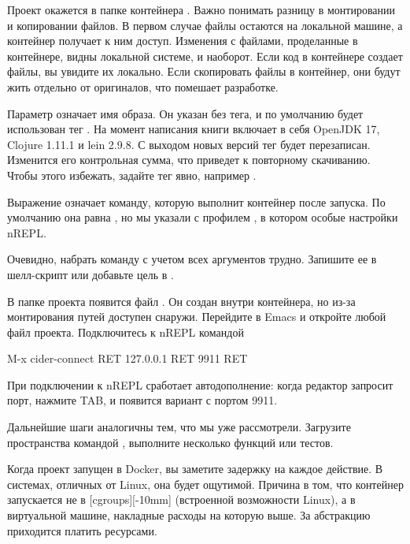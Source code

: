 Проект окажется в папке контейнера . Важно понимать разницу в монтировании и копировании файлов. В первом случае файлы остаются на локальной машине, а контейнер получает к ним доступ. Изменения с файлами, проделанные в контейнере, видны локальной системе, и наоборот. Если код в контейнере создает файлы, вы увидите их локально. Если скопировать файлы в контейнер, они будут жить отдельно от оригиналов, что помешает разработке.

Параметр   означает имя образа. Он указан без тега, и по умолчанию будет использован тег . На момент написания книги  включает в себя OpenJDK 17, Clojure 1.11.1 и lein 2.9.8. С выходом новых версий тег  будет перезаписан. Изменится его контрольная сумма, что приведет к повторному скачиванию. Чтобы этого избежать, задайте тег явно, например .

Выражение   означает команду, которую выполнит контейнер после запуска. По умолчанию она равна , но мы указали  с профилем , в котором особые настройки nREPL.

Очевидно, набрать команду  с учетом всех аргументов трудно. Запишите ее в шелл-скрипт или добавьте цель в .

В папке проекта появится файл . Он создан внутри контейнера, но из-за монтирования путей доступен снаружи. Перейдите в Emacs и откройте любой файл проекта. Подключитесь к nREPL командой

\begin{english}
  \begin{text}
M-x cider-connect RET 127.0.0.1 RET 9911 RET
  \end{text}
\end{english}

При подключении к nREPL сработает автодополнение: когда редактор запросит порт, нажмите TAB, и появится вариант с портом 9911.

Дальнейшие шаги аналогичны тем, что мы уже рассмотрели. Загрузите пространства командой , выполните несколько функций или тестов.

\def\urlcgroups{https://en.wikipedia.org/wiki/Cgroups}

Когда проект запущен в Docker, вы заметите задержку на каждое действие. В системах, отличных от Linux, она будет ощутимой. Причина в том, что контейнер запускается не в \footurl{cgroups}{\urlcgroups}[cgroups][-10mm] (встроенной возможности Linux), а в виртуальной машине, накладные расходы на которую выше. За абстракцию приходится платить ресурсами.

